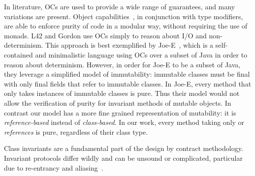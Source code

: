 In literature, OCs are used to provide a wide range of guarantees, and many variations are present.
Object capabilities~\cite{RobustComposition}, in conjunction with type modifiers, are able to
 enforce purity of code in a modular way, without requiring the use of monads.
L42 and Gordon use OCs simply to reason about I/O and non-determinism. This approach is best exemplified by Joe-E~\cite{finifter2008verifiable}, which is a self-contained and minimalistic language using OCs over a subset of Java in order to reason about determinism.
However, in order for Joe-E to be a subset of Java, they leverage a simplified model of immutability:
immutable classes must be final with only final fields that refer to immutable classes.
In Joe-E, every method that only takes instances of immutable classes is pure.
Thus their model would not allow the verification of purity for invariant methods of mutable objects.
In contrast our model has a more fine grained representation of mutability: it is \emph{reference-based} instead of \emph{class-based}. In our work, every method taking only \Q@read@ or \Q@imm@ \emph{references} is pure, regardless of their class type.

Class invariants are a fundamental part of the design by contract methodology. 
Invariant protocols differ wildly and can be unsound or complicated, particular due to re-entrancy and aliasing~\cite{leino2004object,drossopoulou2008unified, meyer2016class}. 

